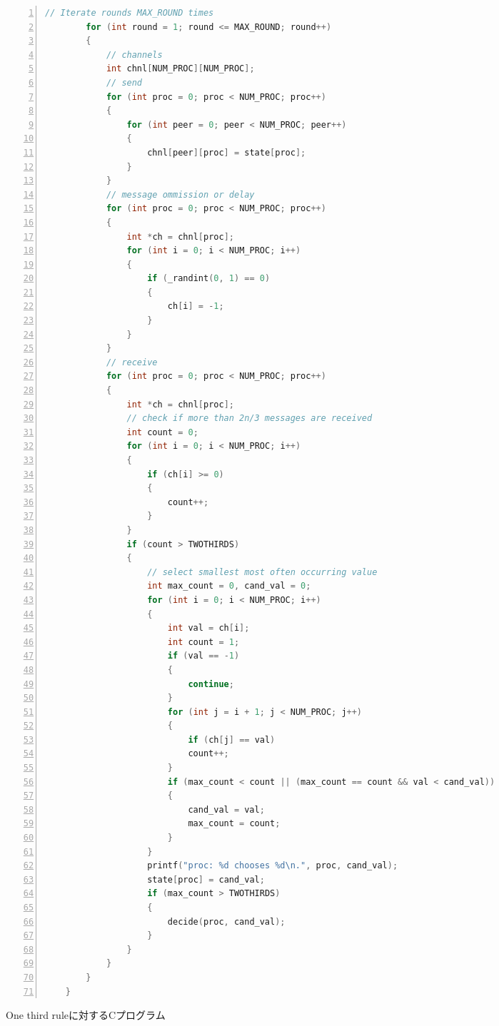 \documentclass[technicalreport]{ieicej}
\theoremstyle{plain}
\begin{document}
\begin{figure*}
\begin{minipage}{0.8\textwidth}
{\begin{lstlisting}[language=c,numbers=left]
        // Iterate rounds MAX_ROUND times
        for (int round = 1; round <= MAX_ROUND; round++)
        {
            // channels
            int chnl[NUM_PROC][NUM_PROC];
            // send
            for (int proc = 0; proc < NUM_PROC; proc++)
            {
                for (int peer = 0; peer < NUM_PROC; peer++)
                {
                    chnl[peer][proc] = state[proc];
                }
            }
            // message ommission or delay
            for (int proc = 0; proc < NUM_PROC; proc++)
            {
                int *ch = chnl[proc];
                for (int i = 0; i < NUM_PROC; i++)
                {
                    if (_randint(0, 1) == 0)
                    {
                        ch[i] = -1;
                    }
                }
            }
            // receive
            for (int proc = 0; proc < NUM_PROC; proc++)
            {
                int *ch = chnl[proc];
                // check if more than 2n/3 messages are received
                int count = 0;
                for (int i = 0; i < NUM_PROC; i++)
                {
                    if (ch[i] >= 0)
                    {
                        count++;
                    }
                }
                if (count > TWOTHIRDS)
                {
                    // select smallest most often occurring value
                    int max_count = 0, cand_val = 0;
                    for (int i = 0; i < NUM_PROC; i++)
                    {
                        int val = ch[i];
                        int count = 1;
                        if (val == -1)
                        {
                            continue;
                        }
                        for (int j = i + 1; j < NUM_PROC; j++)
                        {
                            if (ch[j] == val)
                            count++;
                        }
                        if (max_count < count || (max_count == count && val < cand_val))
                        {
                            cand_val = val;
                            max_count = count;
                        }
                    }
                    printf("proc: %d chooses %d\n.", proc, cand_val);
                    state[proc] = cand_val;
                    if (max_count > TWOTHIRDS)
                    {
                        decide(proc, cand_val);
                    }
                }
            }
        }
    }
\end{lstlisting}
}
\end{minipage}
\caption{One third ruleに対するCプログラム}\label{fig:cprogram}
\end{figure*}
\end{document}
